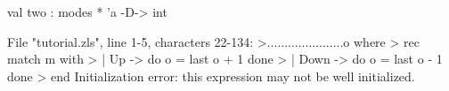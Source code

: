 \chklistingfalse
{}
\begin{ChkListingMsg}
val two : modes * 'a -D-> int 
\end{ChkListingMsg}
\begin{ChkListingErr}
File "tutorial.zls", line 1-5, characters 22-134:
>......................o where
>  rec match m with
>      | Up -> do o = last o + 1 done
>      | Down -> do o = last o - 1 done
>      end
Initialization error: this expression may not be well initialized.
\end{ChkListingErr}
